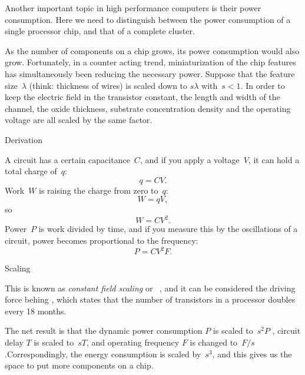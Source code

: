 
Another important topic in high performance computers is their power
consumption. Here
we need to distinguish between the power consumption of a single
processor chip, and that of a complete cluster.

As the number of components on a chip grows, its power consumption
would also grow. Fortunately, in a counter acting trend,
miniaturization of the chip features has simultaneously been reducing
the necessary power. Suppose that the feature size~$\lambda$ (think:
thickness of wires) is scaled down to $s\lambda$ with~$s<1$. In order
to keep the electric field in the transistor constant, the length and
width of the channel, the oxide thickness, substrate concentration
density and the operating voltage are all scaled by the same factor.

 {Derivation}

A circuit has a certain capacitance~$C$, and if you apply a voltage~$V$,
it can hold a total charge of~$q$:
\[ q = CV. \]
Work~$W$ is raising the charge from zero to~$q$:
\[ W = qV, \]
so 
\[ W = CV^2. \]
Power~$P$ is work divided by time, and if you measure this by the oscillations
of a circuit, power becomes proportional to the frequency:
\begin{equation}
P = CV^2F.
\label{eq:power}
\end{equation}

 {Scaling}

This is known as \emph{constant field scaling} or
~\cite{Bohr:30yearDennard,Dennard:scaling},
and it can be considered the driving force behing , which states that the number of transistors in a processor
doubles every 18 months.

The net result
is that the dynamic power consumption $P$ is scaled to~$s^2P$ ,
circuit delay $T$ is scaled to~$sT$, and operating frequency $F$ is
changed to~$F/s$.Correspondingly, the energy consumption is scaled
by~$s^3$, and this gives us the space to put more components on a
chip.


